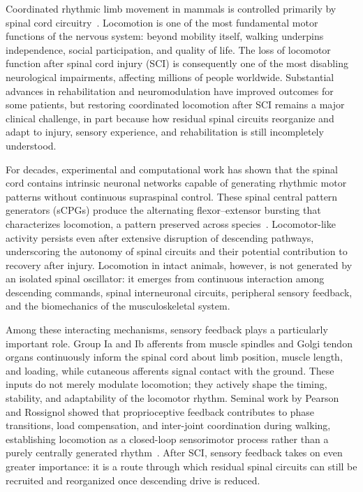 Coordinated rhythmic limb movement in mammals is controlled primarily by
spinal cord circuitry~\cite{grahamBrown1911,kiehn2016}. Locomotion is one of
the most fundamental motor functions of the nervous system: beyond mobility
itself, walking underpins independence, social participation, and quality of
life. The loss of locomotor function after spinal cord injury (SCI) is
consequently one of the most disabling neurological impairments, affecting
millions of people worldwide. Substantial advances in rehabilitation and
neuromodulation have improved outcomes for some patients, but restoring
coordinated locomotion after SCI remains a major clinical challenge, in part
because how residual spinal circuits reorganize and adapt to injury, sensory
experience, and rehabilitation is still incompletely understood.

For decades, experimental and computational work has shown that the spinal
cord contains intrinsic neuronal networks capable of generating rhythmic
motor patterns without continuous supraspinal control. These spinal central
pattern generators (sCPGs) produce the alternating flexor--extensor bursting
that characterizes locomotion, a pattern preserved across
species~\cite{rybak2006,kiehn2016}. Locomotor-like activity persists even
after extensive disruption of descending pathways, underscoring the autonomy
of spinal circuits and their potential contribution to recovery after
injury. Locomotion in intact animals, however, is not generated by an
isolated spinal oscillator: it emerges from continuous interaction among
descending commands, spinal interneuronal circuits, peripheral sensory
feedback, and the biomechanics of the musculoskeletal system.

Among these interacting mechanisms, sensory feedback plays a particularly
important role. Group Ia and Ib afferents from muscle spindles and Golgi
tendon organs continuously inform the spinal cord about limb position,
muscle length, and loading, while cutaneous afferents signal contact with
the ground. These inputs do not merely modulate locomotion; they actively
shape the timing, stability, and adaptability of the locomotor rhythm.
Seminal work by Pearson and Rossignol showed that proprioceptive feedback
contributes to phase transitions, load compensation, and inter-joint
coordination during walking, establishing locomotion as a closed-loop
sensorimotor process rather than a purely centrally generated
rhythm~\cite{pearson1995,rossignol2006}. After SCI, sensory feedback takes on
even greater importance: it is a route through which residual spinal
circuits can still be recruited and reorganized once descending drive is
reduced.

